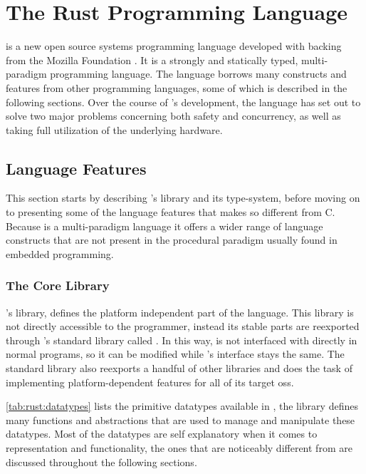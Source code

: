 
\section{The Rust Programming Language} %
\label{sub:the_rust_programming_language}

\rust \cite{web:rust_lang} is a new open source systems programming language developed with backing from the Mozilla Foundation \cite{web:mozilla_foundation}.
It is a strongly and statically typed, multi-paradigm programming language.
The language borrows many constructs and features from other programming languages, some of which is described in the following sections.
Over the course of {\rust}'s development, the language has set out to solve two major problems concerning both safety and concurrency, as well as taking full utilization of the underlying hardware.

\subsection{Language Features}
\label{ssub:rust:features}

This section starts by describing {\rust}'s {\core} library and its type-system, before moving on to presenting some of the language features that makes {\rust} so different from C.
Because {\rust} is a multi-paradigm language it offers a wider range of language constructs that are not present in the procedural paradigm usually found in embedded programming.

\subsubsection{The Core Library}

\rust's {\core} library, defines the platform independent part of the language.
This library is not directly accessible to the programmer, instead its stable parts are reexported through {\rust}'s standard library called {\std}.
In this way, {\core} is not interfaced with directly in normal {\rust} programs, so it can be modified while {\std}'s interface stays the same.
The standard library also reexports a handful of other libraries and does the task of implementing platform-dependent features for all of its target \glspl{os}.

\autoref{tab:rust:datatypes} lists the primitive datatypes available in {\rust}, the {\core} library defines many functions and abstractions that are used to manage and manipulate these datatypes.
Most of the datatypes are self explanatory when it comes to representation and functionality, the ones that are noticeably different from {\C} are discussed throughout the following sections.

